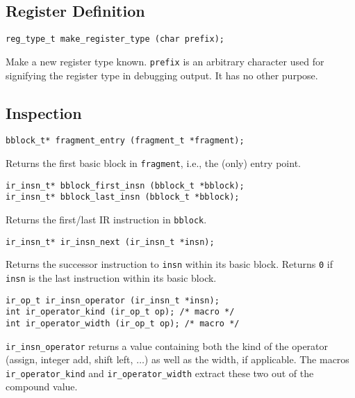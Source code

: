 \documentclass{article}
\newcommand{\cc}[1]{\texttt{#1}} %
\begin{document}
\subsection{Register Definition}
\label{sec:regdef}

\begin{verbatim}
reg_type_t make_register_type (char prefix);
\end{verbatim}

Make a new register type known.  \cc{prefix} is an arbitrary character
used for signifying the register type in debugging output.  It has no
other purpose.

\subsection{Inspection}

\begin{verbatim}
bblock_t* fragment_entry (fragment_t *fragment);
\end{verbatim}

Returns the first basic block in \cc{fragment}, i.e., the (only) entry
point.

\begin{verbatim}
ir_insn_t* bblock_first_insn (bblock_t *bblock);
ir_insn_t* bblock_last_insn (bblock_t *bblock);
\end{verbatim}

Returns the first/last IR instruction in \cc{bblock}.

\begin{verbatim}
ir_insn_t* ir_insn_next (ir_insn_t *insn);
\end{verbatim}

Returns the successor instruction to \cc{insn} within its basic block.
Returns \cc{0} if \cc{insn} is the last instruction within its basic
block.

\begin{verbatim}
ir_op_t ir_insn_operator (ir_insn_t *insn);
int ir_operator_kind (ir_op_t op); /* macro */
int ir_operator_width (ir_op_t op); /* macro */
\end{verbatim}

\cc{ir\_insn\_operator} returns a value containing both the kind of the
operator (assign, integer add, shift left, $\ldots$) as well as the
width, if applicable.  The macros \cc{ir\_operator\_kind} and
\cc{ir\_operator\_width} extract these two out of the compound value.
\end{document}
